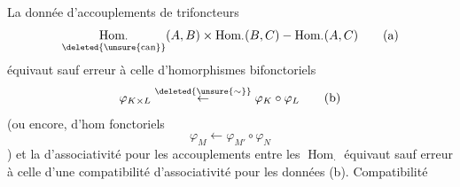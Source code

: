 La donnée d'accouplements de trifoncteurs
\[
\underset{\deleted{\unsure{\rm can}}}{\operatorname{Hom}_{\cdot}}(A,B)\times\operatorname{Hom}_{\cdot}(B,C)\mathbin{-}\operatorname{Hom}_{\cdot}(A,C)\tag*{(a)}
\]
équivaut sauf erreur à celle d'homorphismes
bifonctoriels
\[
\varphi_{K\times L}\mathrel{\overset{\deleted{\unsure{\sim}}}{\leftarrow}}\varphi_K\circ\varphi_L\tag*{(b)}
\]
(ou encore, d'hom fonctoriels
\[
\varphi_M\longleftarrow\varphi_{M'}\circ\varphi_N\tag*{(c)}
\]
)
et la   d'associativité  pour
les accouplements entre les $\operatorname{Hom}_{\cdot}$ équivaut
sauf erreur à celle d'une  compatibilité
d'associativité pour les données (b). Compatibilité
